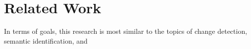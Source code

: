 \section{Related Work}
\label{sec:related_work}

In terms of goals, this research is most similar to the topics of change detection, semantic identification, and 

% 